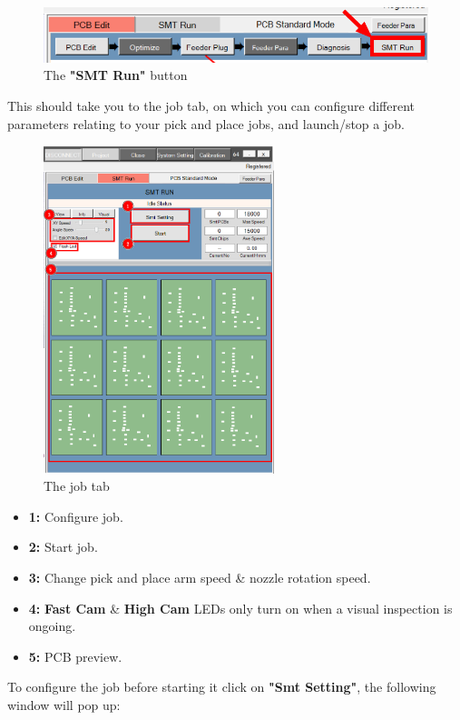 \documentclass[a4paper,10pt]{report}
\begin{document}
 \begin{figure}[!htb]
 \centering
 \includegraphics[width=1\textwidth]{scrot30.png}
 \caption{The \textbf{"SMT Run"} button}
\end{figure}
This should take you to the job tab, on which you can configure different parameters relating to your pick and place jobs, and launch/stop a job.
 \begin{figure}[!htb]
 \centering
 \includegraphics[width=0.6\textwidth]{scrot31.png}
 \caption{The job tab}
\end{figure}
\newpage
\begin{itemize}
 \item \textbf{1: } Configure job.
 \item \textbf{2: } Start job.
 \item \textbf{3: } Change pick and place arm speed \& nozzle rotation speed.
 \item \textbf{4: } \textbf{Fast Cam} \& \textbf{High Cam} LEDs only turn on when a visual inspection is ongoing.
 \item \textbf{5: } PCB preview.
\end{itemize}
To configure the job before starting it click on \textbf{"Smt Setting"}, the following window will pop up:
\end{document}

